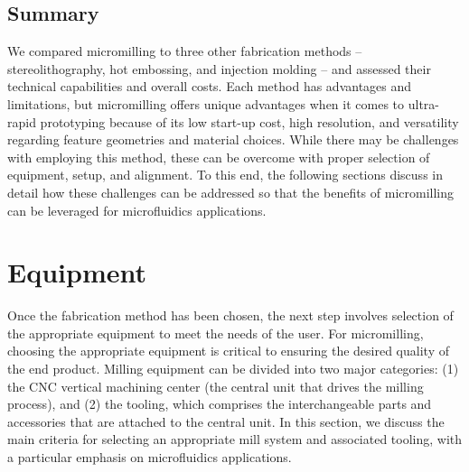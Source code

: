 {\subsection{Summary}
We compared micromilling to three other fabrication methods -- stereolithography, hot embossing, and injection molding -- and assessed their technical capabilities and overall costs. Each method has advantages and limitations, but micromilling offers unique advantages when it comes to ultra-rapid prototyping because of its low start-up cost, high resolution, and versatility regarding feature geometries and material choices. While there may be challenges with employing this method, these can be overcome with proper selection of equipment, setup, and alignment. To this end, the following sections discuss in detail how these challenges can be addressed so that the benefits of micromilling can be leveraged for microfluidics applications.


\section{Equipment}
Once the fabrication method has been chosen, the next step involves selection of the appropriate equipment to meet the needs of the user. For micromilling, choosing the appropriate equipment is critical to ensuring the desired quality of the end product. Milling equipment can be divided into two major categories: (1) the CNC vertical machining center (the central unit that drives the milling process), and (2) the tooling, which comprises the interchangeable parts and accessories that are attached to the central unit. In this section, we discuss the main criteria for selecting an appropriate mill system and associated tooling, with a particular emphasis on microfluidics applications.

}
